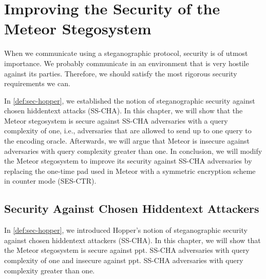 \chapter{Improving the Security of the Meteor Stegosystem}
\label{chap:security}

When we communicate using a steganographic protocol, security is of utmost importance.
We probably communicate in an environment that is very hostile against its parties.
Therefore, we should satisfy the most rigorous security requirements we can.

In \autoref{def:sec-hopper}, we established the notion of steganographic security against chosen hiddentext attacks (SS-CHA).
In this chapter, we will show that the Meteor stegosystem is secure against SS-CHA adversaries with a query complexity of one, i.e., adversaries that are allowed to send up to one query to the encoding oracle.
Afterwards, we will argue that Meteor is insecure against adversaries with query complexity greater than one.
In conclusion, we will modify the Meteor stegosystem to improve its security against SS-CHA adversaries by replacing the one-time pad used in Meteor with a symmetric encryption scheme in counter mode (SES-CTR).

\section{Security Against Chosen Hiddentext Attackers}

In \autoref{def:sec-hopper}, we introduced Hopper's notion of steganographic security against chosen hiddentext attackers (SS-CHA).
In this chapter, we will show that the Meteor stegosystem is secure against ppt. SS-CHA adversaries with query complexity of one and insecure against ppt. SS-CHA adversaries with query complexity greater than one.


